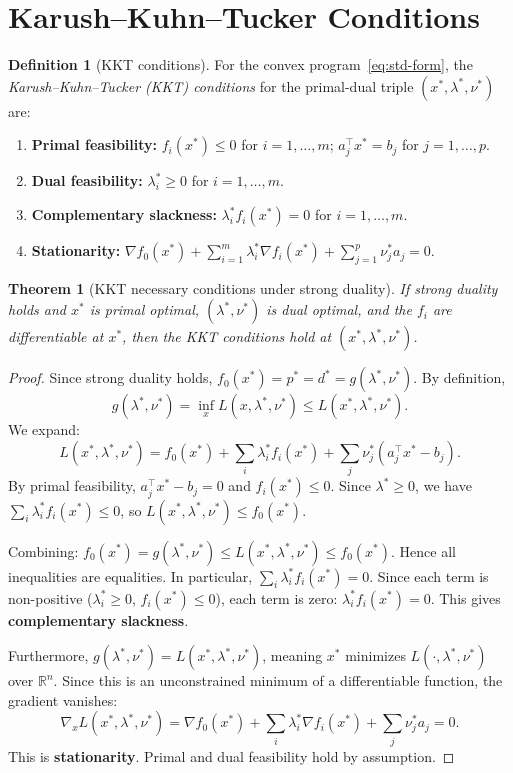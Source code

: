 \documentclass[11pt,a4paper]{article}
\theoremstyle{definition}
\newtheorem{definition}{Definition}[section]
\theoremstyle{plain}
\newtheorem{theorem}{Theorem}[section]
\theoremstyle{remark}
\newcommand{\R}{\mathbb{R}}
\begin{document}
\section{Karush--Kuhn--Tucker Conditions}\label{sec:kkt}

\begin{definition}[KKT conditions]\label{def:kkt}
For the convex program~\eqref{eq:std-form}, the \emph{Karush--Kuhn--Tucker
(KKT) conditions} for the primal-dual triple $(x^*, \lambda^*, \nu^*)$ are:
\begin{enumerate}[label=(KKT\arabic*)]
  \item \textbf{Primal feasibility:}
    $f_i(x^*) \le 0$ for $i = 1,\dots,m$; \;
    $a_j^\top x^* = b_j$ for $j = 1,\dots,p$.
  \item \textbf{Dual feasibility:}
    $\lambda^*_i \ge 0$ for $i = 1,\dots,m$.
  \item \textbf{Complementary slackness:}
    $\lambda^*_i f_i(x^*) = 0$ for $i = 1,\dots,m$.
  \item \textbf{Stationarity:}
    $\nabla f_0(x^*) + \sum_{i=1}^m \lambda^*_i \nabla f_i(x^*)
     + \sum_{j=1}^p \nu^*_j a_j = 0$.
\end{enumerate}
\end{definition}

\begin{theorem}[KKT necessary conditions under strong duality]\label{thm:kkt-necessary}
If strong duality holds and $x^*$ is primal optimal, $(\lambda^*, \nu^*)$ is
dual optimal, and the $f_i$ are differentiable at $x^*$, then the KKT
conditions hold at $(x^*, \lambda^*, \nu^*)$.
\end{theorem}

\begin{proof}
Since strong duality holds, $f_0(x^*) = p^* = d^* = g(\lambda^*, \nu^*)$.
By definition,
\[
  g(\lambda^*, \nu^*) = \inf_x L(x, \lambda^*, \nu^*) \le L(x^*, \lambda^*, \nu^*).
\]
We expand:
\[
  L(x^*, \lambda^*, \nu^*)
  = f_0(x^*) + \sum_i \lambda^*_i f_i(x^*) + \sum_j \nu^*_j(a_j^\top x^* - b_j).
\]
By primal feasibility, $a_j^\top x^* - b_j = 0$ and $f_i(x^*) \le 0$. Since
$\lambda^* \ge 0$, we have $\sum_i \lambda^*_i f_i(x^*) \le 0$, so
$L(x^*, \lambda^*, \nu^*) \le f_0(x^*)$.

Combining: $f_0(x^*) = g(\lambda^*, \nu^*) \le L(x^*, \lambda^*, \nu^*) \le f_0(x^*)$.
Hence all inequalities are equalities. In particular,
$\sum_i \lambda^*_i f_i(x^*) = 0$. Since each term is non-positive
($\lambda^*_i \ge 0$, $f_i(x^*) \le 0$), each term is zero:
$\lambda^*_i f_i(x^*) = 0$. This gives \textbf{complementary slackness}.

Furthermore, $g(\lambda^*, \nu^*) = L(x^*, \lambda^*, \nu^*)$, meaning $x^*$
minimizes $L(\cdot, \lambda^*, \nu^*)$ over $\R^n$. Since this is an
unconstrained minimum of a differentiable function, the gradient vanishes:
\[
  \nabla_x L(x^*, \lambda^*, \nu^*)
  = \nabla f_0(x^*) + \sum_i \lambda^*_i \nabla f_i(x^*) + \sum_j \nu^*_j a_j
  = 0.
\]
This is \textbf{stationarity}. Primal and dual feasibility hold by assumption.
\end{proof}
\end{document}

